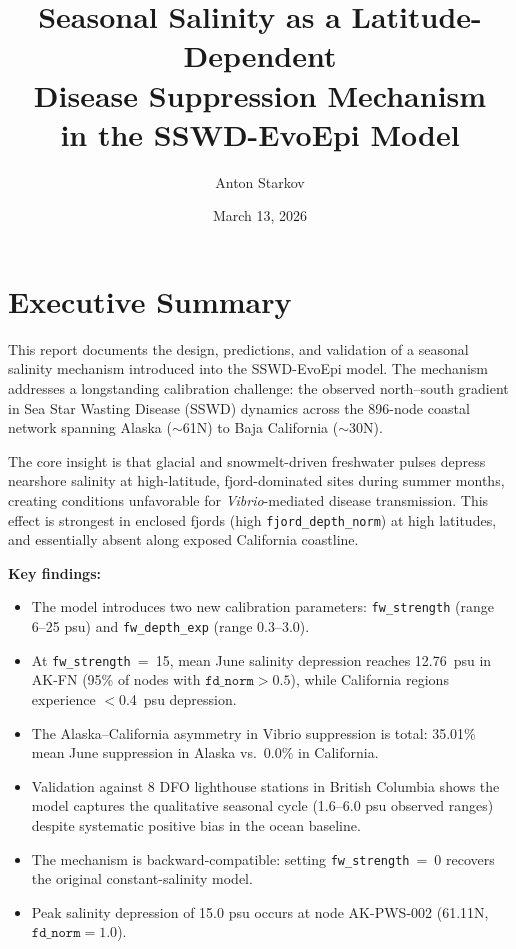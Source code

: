 \documentclass[11pt,a4paper]{article}
\title{\textbf{Seasonal Salinity as a Latitude-Dependent\\Disease Suppression Mechanism\\in the SSWD-EvoEpi Model}}
\author{Anton Starkov}
\date{March 13, 2026}
\begin{document}
\maketitle

\section{Executive Summary}

This report documents the design, predictions, and validation of a seasonal salinity mechanism introduced into the SSWD-EvoEpi model. The mechanism addresses a longstanding calibration challenge: the observed north--south gradient in Sea Star Wasting Disease (SSWD) dynamics across the 896-node coastal network spanning Alaska ($\sim$61\textdegree N) to Baja California ($\sim$30\textdegree N).

The core insight is that glacial and snowmelt-driven freshwater pulses depress nearshore salinity at high-latitude, fjord-dominated sites during summer months, creating conditions unfavorable for \textit{Vibrio}-mediated disease transmission. This effect is strongest in enclosed fjords (high \texttt{fjord\_depth\_norm}) at high latitudes, and essentially absent along exposed California coastline.

\textbf{Key findings:}
\begin{itemize}[nosep]
    \item The model introduces two new calibration parameters: \texttt{fw\_strength} (range 6--25 psu) and \texttt{fw\_depth\_exp} (range 0.3--3.0).
    \item At \texttt{fw\_strength}~=~15, mean June salinity depression reaches 12.76~psu in AK-FN (95\% of nodes with $\texttt{fd\_norm} > 0.5$), while California regions experience $<$0.4~psu depression.
    \item The Alaska--California asymmetry in Vibrio suppression is total: 35.01\% mean June suppression in Alaska vs.\ 0.0\% in California.
    \item Validation against 8 DFO lighthouse stations in British Columbia shows the model captures the qualitative seasonal cycle (1.6--6.0 psu observed ranges) despite systematic positive bias in the ocean baseline.
    \item The mechanism is backward-compatible: setting \texttt{fw\_strength}~=~0 recovers the original constant-salinity model.
    \item Peak salinity depression of 15.0 psu occurs at node AK-PWS-002 (61.11\textdegree N, $\texttt{fd\_norm} = 1.0$).
\end{itemize}
\end{document}
